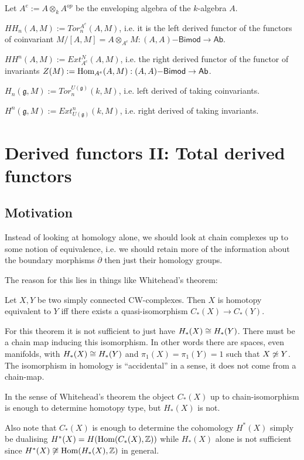 \documentclass[fontsize=11pt,fleqn,a4paper]{scrartcl}
\begin{document}
\begin{example}
Let $A^e := A\otimes_k A^{op}$ be the enveloping algebra of the $k$-algebra $A$.

$HH_n(A,M) := Tor_n^{A^e}(A,M)$, i.e. it is the left derived functor of the functors of coinvariant $M/[A,M] = A\otimes_{A^e} M: (A,A)\mathsf{-Bimod} \to \mathsf{Ab}$.

$HH^n(A,M) := Ext_{A^e}^N(A,M)$, i.e. the right derived functor of the functor of invariants $Z(M) := \operatorname{Hom}_{A^e}(A,M): (A,A)\mathsf{-Bimod} \to \mathsf{Ab}$.
\end{example}

\begin{example}
$H_n(\mathfrak{g},M) := Tor_n^{U(\mathfrak{g})}(k,M)$, i.e. left derived of taking coinvariants.

$H^n(\mathfrak{g},M) := Ext^n_{U(\mathfrak{g})}(k,M)$, i.e. right derived of taking invariants.
\end{example}

\section{Derived functors II: Total derived functors}

\subsection{Motivation}

\begin{remark}
Instead of looking at homology alone, we should look at chain complexes up to some notion of equivalence, i.e. we should retain more of the information about the boundary morphisms $\partial$ then just their homology groups.

The reason for this lies in things like Whitehead's theorem:

\begin{theorem}
Let $X,Y$ be two simply connected CW-complexes. Then $X$ is homotopy equivalent to $Y$ iff there exists a quasi-isomorphism $C_\ast(X) \to C_\ast(Y)$.
\end{theorem}

For this theorem it is not sufficient to just have $H_\ast(X) \cong H_\ast(Y)$. There must be a chain map inducing this isomorphism. In other words there are spaces, even manifolds, with $H_\ast(X)\cong H_\ast(Y)$ and $\pi_1(X) = \pi_1(Y) = 1$ such that $X \not \simeq Y$. The isomorphism in homology is \enquote{accidental} in a sense, it does not come from a chain-map.

In the sense of Whitehead's theorem the object $C_\ast(X)$ up to chain-isomorphism is enough to determine homotopy type, but $H_\ast(X)$ is not.

Also note that $C_\ast(X)$ is enough to determine the cohomology $H^\ast(X)$ simply be dualising $H^\ast(X) = H(\operatorname{Hom}(C_\ast(X),\mathbb{Z}))$ while $H_\ast(X)$ alone is not sufficient since $H^\ast(X) \not\cong \operatorname{Hom}(H_\ast(X),\mathbb{Z})$ in general.
\end{remark}
\end{document}
